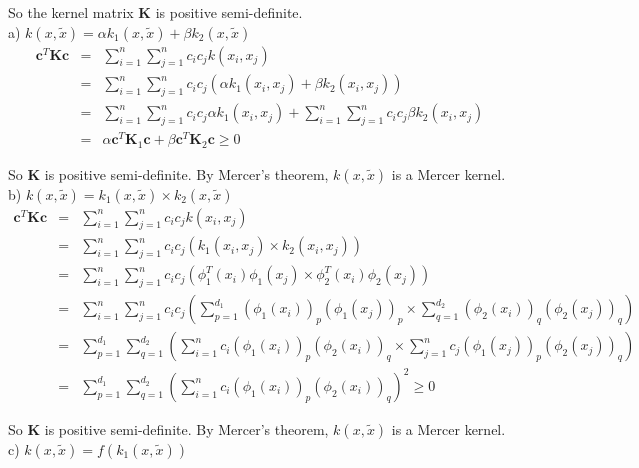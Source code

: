\documentclass[12pt]{article}
\begin{document}
So the kernel matrix \textbf{K} is positive semi-definite. \\

a) $k(x, \tilde{x}) = \alpha k_1(x, \tilde{x}) + \beta k_2(x, \tilde{x})$
\begin{eqnarray*}
  \textbf{c}^T \textbf{Kc}
  &=& \sum_{i=1}^n \sum_{j=1}^n c_i c_j k(x_i,x_j) \\
  &=& \sum_{i=1}^n \sum_{j=1}^n c_i c_j 
  \left( \alpha k_1(x_i,x_j) + \beta k_2(x_i,x_j) \right) \\
  &=& \sum_{i=1}^n \sum_{j=1}^n c_i c_j \alpha k_1(x_i,x_j)
  + \sum_{i=1}^n \sum_{j=1}^n c_i c_j \beta k_2(x_i,x_j) \\
  &=& \alpha \textbf{c}^T \textbf{K}_1 \textbf{c}
  + \beta \textbf{c}^T \textbf{K}_2 \textbf{c} \ge 0
\end{eqnarray*}

So \textbf{K} is positive semi-definite. By Mercer's theorem, $k(x, \tilde{x})$ is a Mercer kernel. \\

b) $k(x, \tilde{x}) = k_1(x, \tilde{x}) \times k_2(x, \tilde{x})$
\begin{eqnarray*}
  \textbf{c}^T \textbf{Kc}
  &=& \sum_{i=1}^n \sum_{j=1}^n c_i c_j k(x_i,x_j) \\
  &=& \sum_{i=1}^n \sum_{j=1}^n c_i c_j 
  \left( k_1(x_i,x_j) \times k_2(x_i,x_j) \right) \\
  &=& \sum_{i=1}^n \sum_{j=1}^n c_i c_j 
  \left( \phi_1^T(x_i) \phi_1(x_j) \times \phi_2^T(x_i) \phi_2(x_j) \right) \\
  &=& \sum_{i=1}^n \sum_{j=1}^n c_i c_j 
  \left( \sum_{p=1}^{d_1} (\phi_1(x_i))_p (\phi_1(x_j))_p 
  \times \sum_{q=1}^{d_2} (\phi_2(x_i))_q (\phi_2(x_j))_q \right) \\
  &=& \sum_{p=1}^{d_1} \sum_{q=1}^{d_2} \left(
  \sum_{i=1}^n c_i (\phi_1(x_i))_p (\phi_2(x_i))_q
  \times \sum_{j=1}^n c_j (\phi_1(x_j))_p (\phi_2(x_j))_q
  \right) \\
  &=& \sum_{p=1}^{d_1} \sum_{q=1}^{d_2}
  \left( \sum_{i=1}^n c_i (\phi_1(x_i))_p (\phi_2(x_i))_q \right)^2 \ge 0
\end{eqnarray*}

So \textbf{K} is positive semi-definite. By Mercer's theorem, $k(x, \tilde{x})$ is a Mercer kernel. \\

c) $k(x, \tilde{x}) = f(k_1(x, \tilde{x}))$ \\
\end{document}

